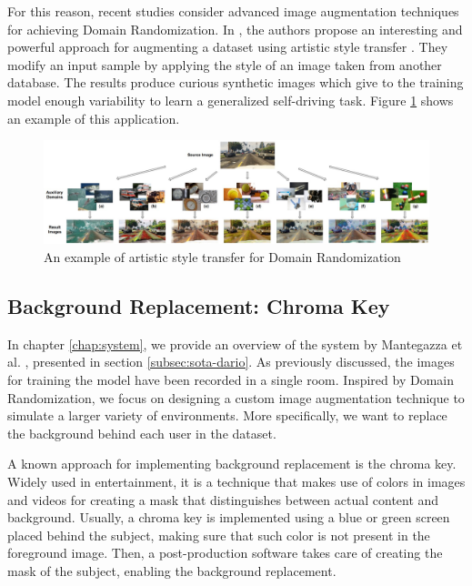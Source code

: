 For this reason, recent studies consider advanced image augmentation techniques for achieving Domain Randomization. In \cite{yue2019domain}, the authors propose an interesting and powerful approach for augmenting a dataset using artistic style transfer \cite{gatys2015neural}. They modify an input sample by applying the style of an image taken from another database. The results produce curious synthetic images which give to the training model enough variability to learn a generalized self-driving task. Figure \ref{fig:02-domain-artistic} shows an example of this application.

\begin{figure}[!h]
    \centering
    \includegraphics[width=1\textwidth]{"contents/images/02-domain-artistic"}
    \caption[An example of artistic style transfer for Domain Randomization]{An example of artistic style transfer for Domain Randomization \cite{yue2019domain}}
    \label{fig:02-domain-artistic}
\end{figure}



\subsection{Background Replacement: Chroma Key}

In chapter \ref{chap:system}, we provide an overview of the system by Mantegazza et al. \cite{mantegazza2019visionbased}, presented in section \ref{subsec:sota-dario}. As previously discussed, the images for training the model have been recorded in a single room. Inspired by Domain Randomization, we focus on designing a custom image augmentation technique to simulate a larger variety of environments. More specifically, we want to replace the background behind each user in the dataset.

\medskip

A known approach for implementing background replacement is the chroma key. Widely used in entertainment, it is a technique that makes use of colors in images and videos for creating a mask that distinguishes between actual content and background. Usually, a chroma key is implemented using a blue or green screen placed behind the subject, making sure that such color is not present in the foreground image. Then, a post-production software takes care of creating the mask of the subject, enabling the background replacement.

